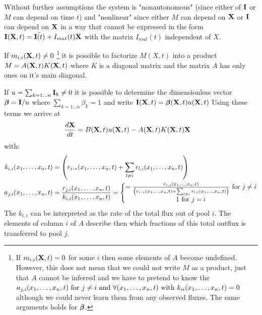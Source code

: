 Without further assumptions the system is "nonautonomous" (since either of $\mathbf{I}$ or $M$ can depend on time $t$) 
and "nonlinear" since either $M$ can depend on $\mathbf{X}$ or $\mathbf{I}$ can depend on $\mathbf{X}$ in a way that cannot be expressed in the form $\mathbf{I}(\mathbf{X},t)=\tilde{\mathbf{I}(t)}+I_{mat}(t)\mathbf{X}$ with the matrix $I_{mat}(t)$ independent of $X$.

If $m_{i,i}(\mathbf{X},t) \ne 0$ 
\footnote{
  If $m_{i,i}(\mathbf{X},t) = 0 $ for some $i$ then some elements of $A$ become
  undefined. However, this does not mean that we could not write $M$ as a
  product, just that $A$ cannot be inferred and we have to pretend to know the
  $a_{j,i}(x_1, \dots, x_n, t) \text{ for } j\ne i \text{ and } \forall (x_1, \dots, x_n, t) \text{ with }
  k_{ii}(x_1, \dots, x_n, t)=0 $ although we could never learn them from any observed fluxes.
  The same arguments holds for $\bm{\beta}$.
}
it is possible to factorize $M(X,t)$ into a product $M=A(\mathbf{X},t) K(\mathbf{X},t)$ where $K$ is
a diagonal matrix and the matrix $A$ has only ones on it's main diagonal. 

If $u=\sum_{k=1\dots n} \mathbf{I}_k \ne 0$ it is possible to determine the dimensionless vector $\bm{\beta} = \mathbf{I}/u$ where $\sum_{k=1\dots n} \beta_k =1$ and write $\mathbf{I}(\mathbf{X},t)=\bm{\beta}(\mathbf{X},t)u(\mathbf{X},t)$ 
Using these terms  we arrive at 
\begin{align*}
\frac{d \mathbf{X}}{d t}&=B(\mathbf{X},t) u(\mathbf{X},t) - A(\mathbf{X},t) K(\mathbf{X},t) \mathbf{X}   
\end{align*}
\newcommand{\kiixt}{
      \left(
      r_{i \rightarrow } \xnt
      + 
      \sum_{l \ne i} r_{l,i} \xnt
      \right)
}
with:
\begin{align}
  k_{i,i}\xnt &=\kiixt \nonumber
  \\
  a_{j,i}\xnt
  &=\frac{r_{j,i}\xnt}{k_{i,i}\xnt}=
  \left\{
  \begin{matrix}
    =\frac{
    r_{i,j}\xnt 
  }{
    \kiixt
  } \text{ for } j \ne i
  \\
  1 \text{ for } j=i
  \end{matrix}
  \right.
  \label{aij}
\end{align}
The $k_{i,i}$ can be interpreted as the rate of the total flux out of pool $i$. The elements of column $i$ of $A$ describe then which fractions of this total outflux is transferred to pool $j$. 

